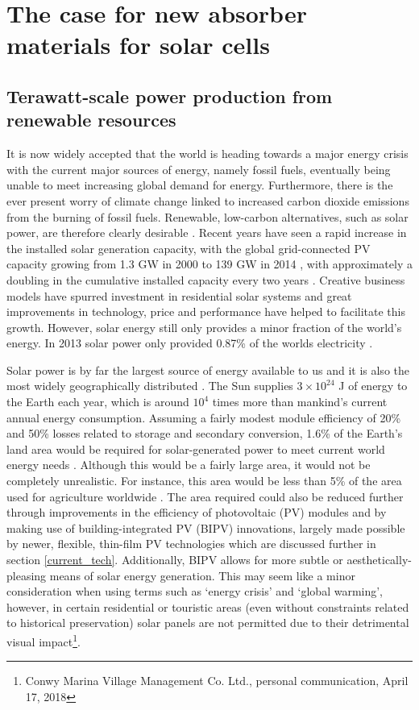 \documentclass[11pt, twoside]{report}
\begin{document}
\section{The case for new absorber materials for solar cells}

\subsection{Terawatt-scale power production from renewable resources}

It is now widely accepted that the world is heading towards a major energy crisis with the current major sources of energy, namely fossil fuels, eventually being unable to meet increasing global demand for energy. Furthermore, there is the ever present worry of climate change linked to increased carbon dioxide emissions from the burning of fossil fuels. Renewable, low-carbon alternatives, such as solar power, are therefore clearly desirable \cite{PV_for_climate_change}. 
Recent years have seen a rapid increase in the installed solar generation capacity, with the global grid-connected PV capacity growing from 1.3 GW in 2000 to 139 GW in 2014 \cite{pathways_129}, with approximately a doubling in the cumulative installed capacity every two years \cite{pathways}. Creative business models have spurred investment in residential solar systems \cite{MIT} and great improvements in technology, price and performance have helped to facilitate this growth. However, solar energy still only provides a minor fraction of the world's energy. In 2013 solar power only provided 0.87\% of the worlds electricity \cite{pathways_130}.

Solar power is by far the largest source of energy available to us and it is also the most widely geographically distributed \cite{inorg_pv}. The Sun supplies $3 \times 10^{24}$ J of energy to the Earth each year, which is around $10^4$ times more than mankind's current annual energy consumption. 
Assuming a fairly modest module efficiency of 20\% and 50\% losses related to storage and secondary conversion, 1.6\% of the Earth’s land area would be required for solar-generated power to meet current world energy needs \cite{newPVrev}. Although this would be a fairly large area, it would not be completely unrealistic. For instance, this area would be less than 5\% of the area used for agriculture worldwide \cite{newPVrev}. The area required could also be reduced further through improvements in the efficiency of photovoltaic (PV) modules and by making use of building-integrated PV (BIPV) innovations, largely made possible by newer, flexible, thin-film PV technologies which are discussed further in section \ref{current_tech}.
Additionally, BIPV allows for more subtle or aesthetically-pleasing means of solar energy generation. This may seem like a minor consideration when using terms such as `energy crisis' and `global warming', however, in certain residential or touristic areas (even without constraints related to historical preservation) solar panels are not permitted due to their detrimental visual impact\footnote{Conwy Marina Village Management Co. Ltd., personal communication, April 17, 2018}.
\end{document}
